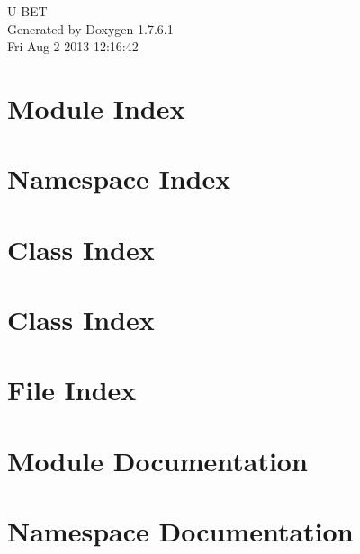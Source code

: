 \documentclass[a4paper]{book}
\begin{document}
\hypersetup{pageanchor=false,citecolor=blue}
\begin{titlepage}
\vspace*{7cm}
\begin{center}
{\Large \-U-\/\-B\-E\-T }\\
\vspace*{1cm}
{\large \-Generated by Doxygen 1.7.6.1}\\
\vspace*{0.5cm}
{\small Fri Aug 2 2013 12:16:42}\\
\end{center}
\end{titlepage}
\clearemptydoublepage
{}
\tableofcontents
\clearemptydoublepage
{}
\hypersetup{pageanchor=true,citecolor=blue}
\chapter{\-Module \-Index}

\chapter{\-Namespace \-Index}

\chapter{\-Class \-Index}

\chapter{\-Class \-Index}

\chapter{\-File \-Index}

\chapter{\-Module \-Documentation}




\chapter{\-Namespace \-Documentation}

\end{document}
